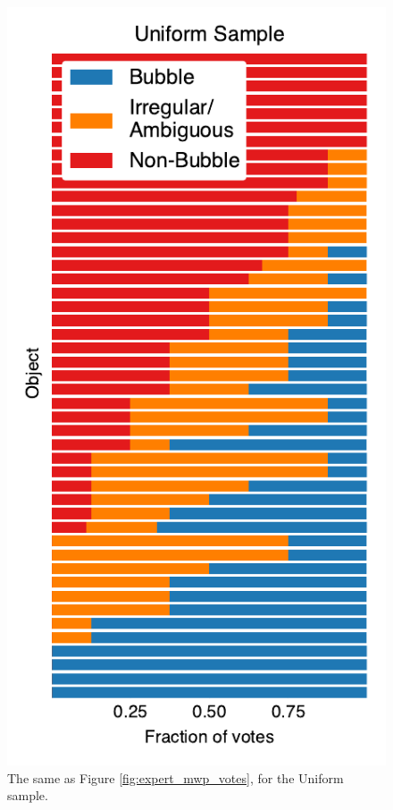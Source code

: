 \begin{figure}[h!]
\includegraphics{expert_uniform_votes}
\caption{The same as Figure \ref{fig:expert_mwp_votes}, for the Uniform sample.}
\label{fig:expert_uniform_votes}
\end{figure}

